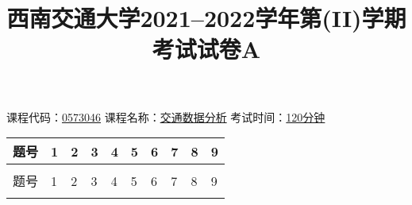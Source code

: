 \documentclass[12pt]{article}
\title{西南交通大学2021--2022学年第(II)学期考试试卷A}
\begin{document}
\maketitle
课程代码：\underline{0573046}%
\hfil 课程名称：\underline{交通数据分析}%
\hfil 考试时间：\underline{120分钟}

\begin{tabular}{|p{1cm}|p{1cm}|p{1cm}|p{1cm}|p{1cm}|p{1cm}|p{1cm}|p{1cm}|p{1cm}|p{1cm}|}
    \hline
    题号 & 1 & 2 & 3 & 4 & 5 & 6 & 7 & 8 & 9\\
    \hline
    & & & & & & & & &  \\
    \hline
    题号 & 1 & 2 & 3 & 4 & 5 & 6 & 7 & 8 & 9\\
    \hline
    & & & & & & & & &  \\
    \hline
\end{tabular}
\end{document}
